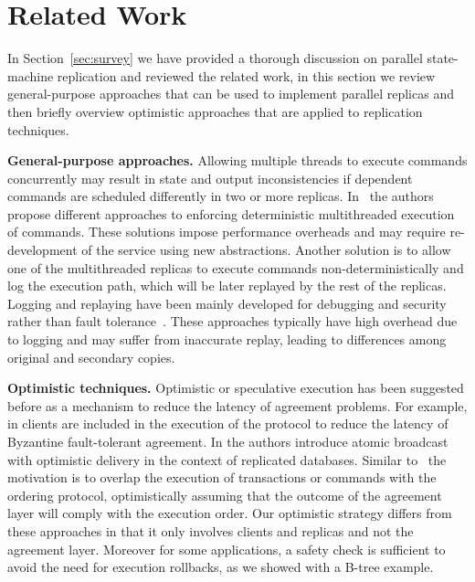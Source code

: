 \documentclass[conference]{IEEEtran}
\begin{document}
\section{Related Work}
\label{sec:rwork}
In Section~\ref{sec:survey} we have provided a thorough discussion on parallel state-machine replication and reviewed the related work, in this section we review general-purpose approaches that can be used to implement parallel replicas and then briefly overview optimistic approaches that are applied to replication techniques. 


\noindent \textbf{General-purpose approaches.} 
Allowing multiple threads to execute commands concurrently may result in state and output inconsistencies if dependent commands are scheduled differently in two or more replicas. In~\cite{AWHF2010,bhcls2010, DLCOM2009, TA2010} the authors propose different approaches to enforcing deterministic multithreaded execution of commands. These solutions impose performance overheads and may require re-development of the service using new abstractions. Another solution is to allow one of the multithreaded replicas to execute commands non-deterministically and log the execution path, which will be later replayed by the rest of the replicas. Logging and replaying have been mainly developed for debugging and security rather than fault tolerance~\cite{AS2009, DLFC2008, PC2008, PZXYKLL2009, RB1999, VLWOCFN2011, XBH2003}. These approaches typically have high overhead due to logging and may suffer from inaccurate replay, leading to differences among original and secondary copies. 

\noindent \textbf{Optimistic techniques.} Optimistic or speculative execution has been suggested before as a mechanism to reduce the latency of agreement problems. For example, in \cite{Kotla:2007, Wester:2009} clients are included in the execution of the protocol to reduce the latency of Byzantine fault-tolerant agreement. In \cite{JPPM02, KPAS99} the authors introduce atomic broadcast with optimistic delivery in the context of replicated databases. Similar to~\cite{marandi2011high} the motivation is to overlap the execution of transactions or commands with the ordering protocol, optimistically assuming that the outcome of the agreement layer will comply with the execution order. Our optimistic strategy differs from these approaches in that it only involves clients and replicas and not the agreement layer. Moreover for some applications, a safety check is sufficient to avoid the need for execution rollbacks, as we showed with a B-tree example. 
\end{document}

